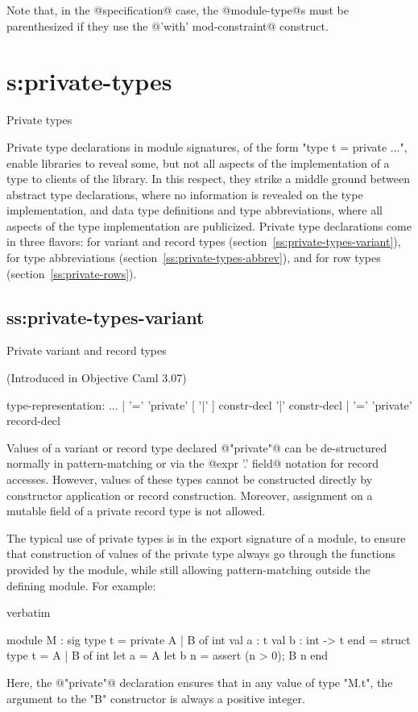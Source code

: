 Note that, in the @specification@ case, the @module-type@s must be
parenthesized if they use the @'with' mod-constraint@ construct.

\section{s:private-types}{Private types}

Private type declarations in module signatures, of the form
"type t = private ...", enable libraries to
reveal some, but not all aspects of the implementation of a type to
clients of the library.  In this respect, they strike a middle ground
between abstract type declarations, where no information is revealed
on the type implementation, and data type definitions and type
abbreviations, where all aspects of the type implementation are
publicized.  Private type declarations come in three flavors: for
variant and record types (section~\ref{ss:private-types-variant}),
for type abbreviations (section~\ref{ss:private-types-abbrev}),
and for row types (section~\ref{ss:private-rows}).

\subsection{ss:private-types-variant}{Private variant and record types}


(Introduced in Objective Caml 3.07)

\begin{syntax}
type-representation:
          ...
        | '=' 'private' [ '|' ] constr-decl { '|' constr-decl }
        | '=' 'private' record-decl
\end{syntax}

Values of a variant or record type declared @"private"@
can be de-structured normally in pattern-matching or via
the @expr '.' field@ notation for record accesses.  However, values of
these types cannot be constructed directly by constructor application
or record construction.  Moreover, assignment on a mutable field of a
private record type is not allowed.

The typical use of private types is in the export signature of a
module, to ensure that construction of values of the private type always
go through the functions provided by the module, while still allowing
pattern-matching outside the defining module.  For example:
\begin{camlexample}{verbatim}
\begin{caml}
\begin{camlinput}
module M : sig
  type t = private A | B of int
  val a : t
  val b : int -> t
end = struct
  type t = A | B of int
  let a = A
  let b n = assert (n > 0); B n
end
\end{camlinput}
\end{caml}
\end{camlexample}
Here, the @"private"@ declaration ensures that in any value of type
"M.t", the argument to the "B" constructor is always a positive integer.

